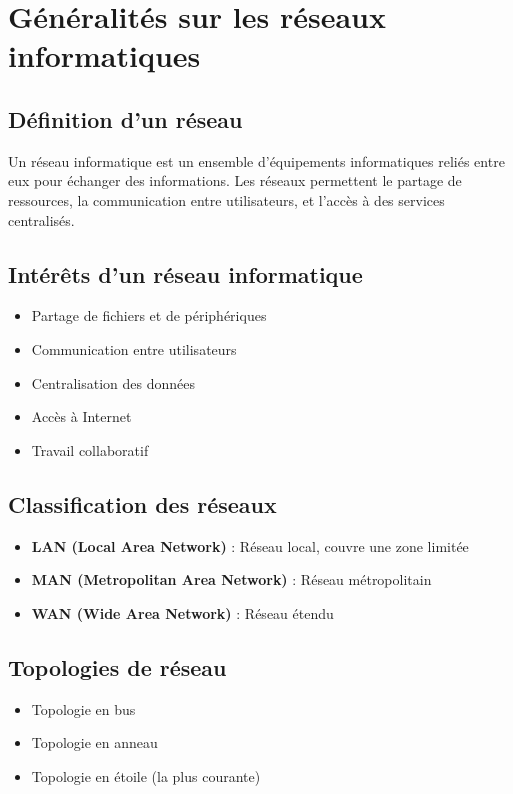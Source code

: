 \documentclass[12pt,a4paper,twoside]{report}
\begin{document}
\chapter{Généralités sur les réseaux informatiques}

\section{Définition d'un réseau}

Un réseau informatique est un ensemble d'équipements informatiques reliés entre eux pour échanger des informations. Les réseaux permettent le partage de ressources, la communication entre utilisateurs, et l'accès à des services centralisés.

\section{Intérêts d'un réseau informatique}

\begin{itemize}
    \item Partage de fichiers et de périphériques
    \item Communication entre utilisateurs
    \item Centralisation des données
    \item Accès à Internet
    \item Travail collaboratif
\end{itemize}

\section{Classification des réseaux}

\begin{itemize}
    \item \textbf{LAN (Local Area Network)} : Réseau local, couvre une zone limitée
    \item \textbf{MAN (Metropolitan Area Network)} : Réseau métropolitain
    \item \textbf{WAN (Wide Area Network)} : Réseau étendu
\end{itemize}

\section{Topologies de réseau}

\begin{itemize}
    \item Topologie en bus
    \item Topologie en anneau
    \item Topologie en étoile (la plus courante)
\end{itemize}
\end{document}
